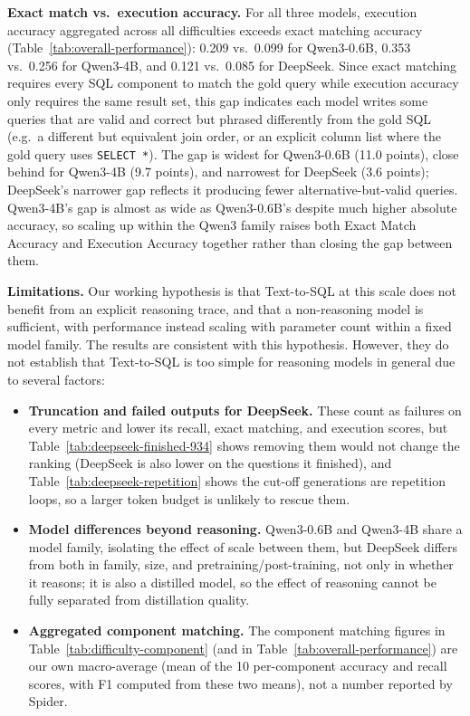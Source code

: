\textbf{Exact match vs.\ execution accuracy.} For all three models, execution accuracy aggregated across all difficulties exceeds exact matching accuracy (Table~\ref{tab:overall-performance}): 0.209 vs.\ 0.099 for Qwen3-0.6B, 0.353 vs.\ 0.256 for Qwen3-4B, and 0.121 vs.\ 0.085 for DeepSeek. Since exact matching requires every SQL component to match the gold query while execution accuracy only requires the same result set, this gap indicates each model writes some queries that are valid and correct but phrased differently from the gold SQL (e.g.\ a different but equivalent join order, or an explicit column list where the gold query uses \texttt{SELECT *}). The gap is widest for Qwen3-0.6B (11.0 points), close behind for Qwen3-4B (9.7 points), and narrowest for DeepSeek (3.6 points); DeepSeek's narrower gap reflects it producing fewer alternative-but-valid queries. Qwen3-4B's gap is almost as wide as Qwen3-0.6B's despite much higher absolute accuracy, so scaling up within the Qwen3 family raises both Exact Match Accuracy and Execution Accuracy together rather than closing the gap between them.

\textbf{Limitations.} Our working hypothesis is that Text-to-SQL at this scale does not benefit from an explicit reasoning trace, and that a non-reasoning model is sufficient, with performance instead scaling with parameter count within a fixed model family. The results are consistent with this hypothesis. However, they do not establish that Text-to-SQL is too simple for reasoning models in general due to several factors:

\begin{itemize}
\item \textbf{Truncation and failed outputs for DeepSeek.} These count as failures on every metric and lower its recall, exact matching, and execution scores, but Table~\ref{tab:deepseek-finished-934} shows removing them would not change the ranking (DeepSeek is also lower on the questions it finished), and Table~\ref{tab:deepseek-repetition} shows the cut-off generations are repetition loops, so a larger token budget is unlikely to rescue them.
\item \textbf{Model differences beyond reasoning.} Qwen3-0.6B and Qwen3-4B share a model family, isolating the effect of scale between them, but DeepSeek differs from both in family, size, and pretraining/post-training, not only in whether it reasons; it is also a distilled model, so the effect of reasoning cannot be fully separated from distillation quality.
\item \textbf{Aggregated component matching.} The component matching figures in Table~\ref{tab:difficulty-component} (and in Table~\ref{tab:overall-performance}) are our own macro-average (mean of the 10 per-component accuracy and recall scores, with F1 computed from these two means), not a number reported by Spider.
\end{itemize}

